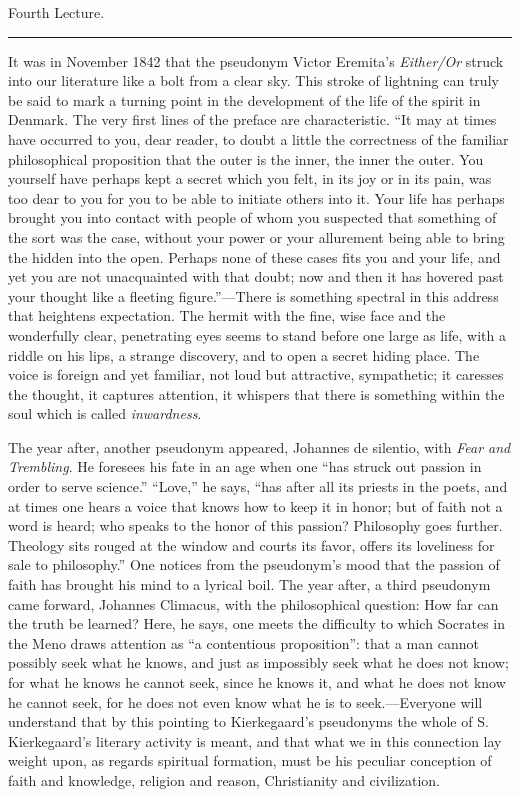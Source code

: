 \documentclass[12pt,a4paper,openany]{book}
\newcommand{\opage}[1]{\marginnote{\footnotesize\textit{[#1]}}}
\newcommand{\lecture}[1]{\clearpage\begin{center}{\large #1}\\[0.4em]\rule{3em}{0.4pt}\end{center}\medskip\noindent}
\begin{document}
\lecture{Fourth Lecture.}
\opage{52}It was in November 1842 that the pseudonym Victor Eremita's
\emph{Either/Or} struck into our literature like a bolt from a clear sky.
This stroke of lightning can truly be said to mark a turning point in the
development of the life of the spirit in Denmark. The very first lines of
the preface are characteristic. ``It may at times have occurred to you,
dear reader, to doubt a little the correctness of the familiar
philosophical proposition that the outer is the inner, the inner the
outer. You yourself have perhaps kept a secret which you felt, in its
joy or in its pain, was too dear to you for you to be able to initiate
others into it. Your life has perhaps brought you into contact with
people of whom you suspected that something of the sort was the case,
without your power or your allurement being able to bring the hidden into
the open. Perhaps none of these cases fits you and your life, and yet you
are not unacquainted with that doubt; now and then it has hovered past
your thought like a fleeting figure.''---There is something spectral in
this address that heightens expectation. The hermit with the fine, wise
face and the wonderfully clear, penetrating \opage{53}eyes seems to stand before
one large as life, with a riddle on his lips, a strange discovery, and to
open a secret hiding place. The voice is foreign and yet familiar, not
loud but attractive, sympathetic; it caresses the thought, it captures
attention, it whispers that there is something within the soul which is
called \emph{inwardness}.

The year after, another pseudonym appeared, Johannes de silentio, with
\emph{Fear and Trembling}. He foresees his fate in an age when one ``has
struck out passion in order to serve science.'' ``Love,'' he says, ``has
after all its priests in the poets, and at times one hears a voice that
knows how to keep it in honor; but of faith not a word is heard; who
speaks to the honor of this passion? Philosophy goes further. Theology
sits rouged at the window and courts its favor, offers its loveliness for
sale to philosophy.'' One notices from the pseudonym's mood that the
passion of faith has brought his mind to a lyrical boil. The year after,
a third pseudonym came forward, Johannes Climacus, with the philosophical
question: How far can the truth be learned? Here, he says, one meets the
difficulty to which Socrates in the Meno draws attention as ``a
contentious proposition'': that a man cannot possibly seek what he knows,
and just as impossibly seek what he does not know; for what he knows he
cannot seek, since he knows it, and what he does not know he cannot seek,
for he does not even know what he is to seek.---Everyone will understand
that by this pointing to Kierkegaard's pseudonyms the whole of
S. Kierkegaard's literary activity is meant, and that what we in this
connection lay weight upon, as regards spiritual formation, must be his
peculiar conception of faith and knowledge, religion and reason,
\opage{54}Christianity and civilization.
\end{document}

